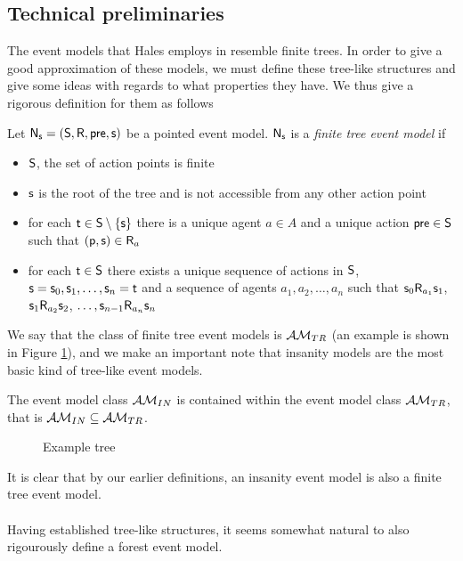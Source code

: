 \subsection{Technical preliminaries} \label{subsec:Multi:techPrelim}

The event models that Hales employs in \cite{hales13synthesis} resemble finite trees.
In order to give a good approximation of these models, we must define these tree-like structures and
give some ideas with regards to what properties they have.
We thus give a rigorous definition for them as follows

\begin{defn} \label{finTree}
Let $\mathrm{\mathsf{N}}_\mathrm{\mathsf{s}} = (\mathrm{\mathsf{S}}, \mathrm{\mathsf{R}}, \mathrm{\mathsf{pre}}, \mathrm{\mathsf{s}})$ be a pointed event model.
$\mathrm{\mathsf{N}}_\mathrm{\mathsf{s}}$ is a {\em finite tree event model} if
\begin{itemize}
	\item $\mathrm{\mathsf{S}}$, the set of action points is finite
	\item $\mathrm{\mathsf{s}}$ is the root of the tree and is not accessible from any other action point
	\item for each $\mathrm{\mathsf{t}} \in \mathrm{\mathsf{S}} \setminus \{ \mathrm{\mathsf{s}} \}$ there is a unique agent $a \in A$ and a unique
	action $\mathrm{\mathsf{pre}} \in \mathrm{\mathsf{S}}$ such that $\mathrm{\mathsf{(p,s)}} \in \mathrm{\mathsf{R}}_a$
	\item for each $\mathrm{\mathsf{t}} \in \mathrm{\mathsf{S}}$ there exists a unique sequence of actions in $\mathrm{\mathsf{S}}$, $\mathrm{\mathsf{s}} = \mathrm{\mathsf{s}}_0,
	\mathrm{\mathsf{s}}_1, \ldots, \mathrm{\mathsf{s}}_n = \mathrm{\mathsf{t}}$ and a sequence of agents $a_1, a_2, \ldots, a_n$ such that $\mathrm{\mathsf{s}}_0
	\mathrm{\mathsf{R}}_{a_1}
	\mathrm{\mathsf{s}}_1$, $\mathrm{\mathsf{s}}_1 \mathrm{\mathsf{R}}_{a_2} \mathrm{\mathsf{s}}_2$, $\ldots, \mathrm{\mathsf{s}}_{n-1} \mathrm{\mathsf{R}}_{a_n} \mathrm{\mathsf{s}}_n$
\end{itemize}
\end{defn}

We say that the class of finite tree event models is $\mathcal{AM}_{TR}$ (an example is shown in Figure
\ref{figure:exampleTree}), and we make an important note that insanity models are the most basic kind of tree-like event models.

\begin{lemma} \label{insaneIsTree}
The event model class $\mathcal{AM}_{IN}$ is contained within the event model class
$\mathcal{AM}_{TR}$, that is $\mathcal{AM}_{IN} \subseteq \mathcal{AM}_{TR}$.
\end{lemma}

\begin{figure}
\centering
\FIXME
\caption{Example tree}
\label{figure:exampleTree}
\end{figure}

It is clear that by our earlier definitions, an insanity event model is also a finite tree event
model.\\
\\
Having established tree-like structures, it seems somewhat natural to also rigourously define a
forest event model.

